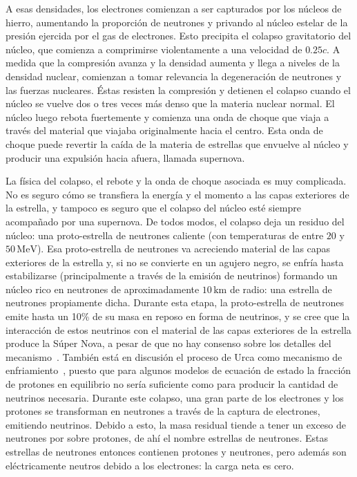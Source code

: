 A esas densidades, los electrones comienzan a ser capturados por los núcleos de hierro, aumentando la proporción de neutrones y privando al núcleo estelar de la presión ejercida por el gas de electrones.
Esto precipita el colapso gravitatorio del núcleo, que comienza a comprimirse violentamente a una velocidad de $0.25c$.
A medida que la compresión avanza y la densidad aumenta y llega a niveles de la densidad nuclear, comienzan a tomar relevancia la degeneración de neutrones y las fuerzas nucleares.
Éstas resisten la compresión y detienen el colapso cuando el núcleo se vuelve dos o tres veces más denso que la materia nuclear normal.
El núcleo luego rebota fuertemente y comienza una onda de choque que viaja a través del material que viajaba originalmente hacia el centro.
Esta onda de choque puede revertir la caída de la materia de estrellas que envuelve al núcleo y producir una expulsión hacia afuera, llamada supernova.

La física del colapso, el rebote y la onda de choque asociada es muy complicada.
No es seguro cómo se transfiera la energía y el momento a las capas exteriores de la estrella, y tampoco es seguro que el colapso del núcleo esté siempre acompañado por una supernova.
De todos modos, el colapso deja un residuo del núcleo: una proto-estrella de neutrones caliente (con temperaturas de entre $20$ y $50\,\text{MeV}$).
Esa proto-estrella de neutrones va acreciendo material de las capas exteriores de la estrella y, si no se convierte en un agujero negro, se enfría hasta estabilizarse (principalmente a través de la emisión de neutrinos) formando un núcleo rico en neutrones de aproximadamente $10\,\text{km}$ de radio: una estrella de neutrones propiamente dicha.
Durante esta etapa, la proto-estrella de neutrones emite hasta un 10\% de su masa en reposo en forma de neutrinos, y se cree que la interacción de estos neutrinos con el material de las capas exteriores de la estrella produce la Súper Nova, a pesar de que no hay consenso sobre los detalles del mecanismo~\cite{woosley_physics_2005, bethe_supernova_1990}.
También está en discusión el proceso de Urca como mecanismo de enfriamiento~\cite{piekarewicz_proton_2012, lattimer_direct_1991}, puesto que para algunos modelos de ecuación de estado la fracción de protones en equilibrio no sería suficiente como para producir la cantidad de neutrinos necesaria.
Durante este colapso, una gran parte de los electrones y los protones se transforman en neutrones a través de la captura de electrones, emitiendo neutrinos.
Debido a esto, la masa residual tiende a tener un exceso de neutrones por sobre protones, de ahí el nombre estrellas de neutrones.
Estas estrellas de neutrones entonces contienen protones y neutrones, pero además son eléctricamente neutros debido a los electrones: la carga neta es cero.

